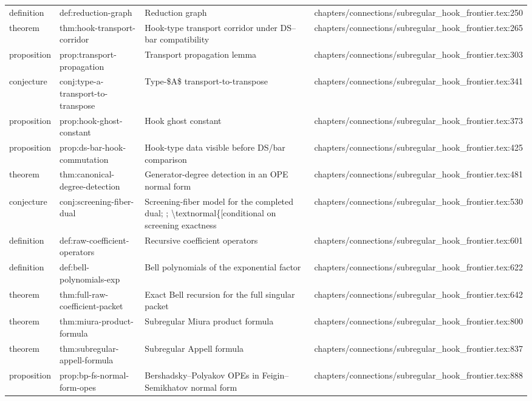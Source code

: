 \documentclass[11pt]{article}
\begin{document}
\begin{longtable}{L{0.10\textwidth}L{0.26\textwidth}L{0.42\textwidth}L{0.22\textwidth}}
definition & def:reduction-graph & Reduction graph & chapters/connections/subregular\_hook\_frontier.tex:250\\
theorem & thm:hook-transport-corridor & Hook-type transport corridor under DS--bar compatibility & chapters/connections/subregular\_hook\_frontier.tex:265\\
proposition & prop:transport-propagation & Transport propagation lemma & chapters/connections/subregular\_hook\_frontier.tex:303\\
conjecture & conj:type-a-transport-to-transpose & Type-\$A\$ transport-to-transpose & chapters/connections/subregular\_hook\_frontier.tex:341\\
proposition & prop:hook-ghost-constant & Hook ghost constant & chapters/connections/subregular\_hook\_frontier.tex:373\\
proposition & prop:ds-bar-hook-commutation & Hook-type data visible before DS/bar comparison & chapters/connections/subregular\_hook\_frontier.tex:425\\
theorem & thm:canonical-degree-detection & Generator-degree detection in an OPE normal form & chapters/connections/subregular\_hook\_frontier.tex:481\\
conjecture & conj:screening-fiber-dual & Screening-fiber model for the completed dual; ; \textbackslash{}textnormal\{[cond{}itional on screening exactness & chapters/connections/subregular\_hook\_frontier.tex:530\\
definition & def:raw-coefficient-operators & Recursive coefficient operators & chapters/connections/subregular\_hook\_frontier.tex:601\\
definition & def:bell-polynomials-exp & Bell polynomials of the exponential factor & chapters/connections/subregular\_hook\_frontier.tex:622\\
theorem & thm:full-raw-coefficient-packet & Exact Bell recursion for the full singular packet & chapters/connections/subregular\_hook\_frontier.tex:642\\
theorem & thm:miura-product-formula & Subregular Miura product formula & chapters/connections/subregular\_hook\_frontier.tex:800\\
theorem & thm:subregular-appell-formula & Subregular Appell formula & chapters/connections/subregular\_hook\_frontier.tex:837\\
proposition & prop:bp-fs-normal-form-opes & Bershadsky--Polyakov OPEs in Feigin--Semikhatov normal form & chapters/connections/subregular\_hook\_frontier.tex:888\\

\end{longtable}
\end{document}

